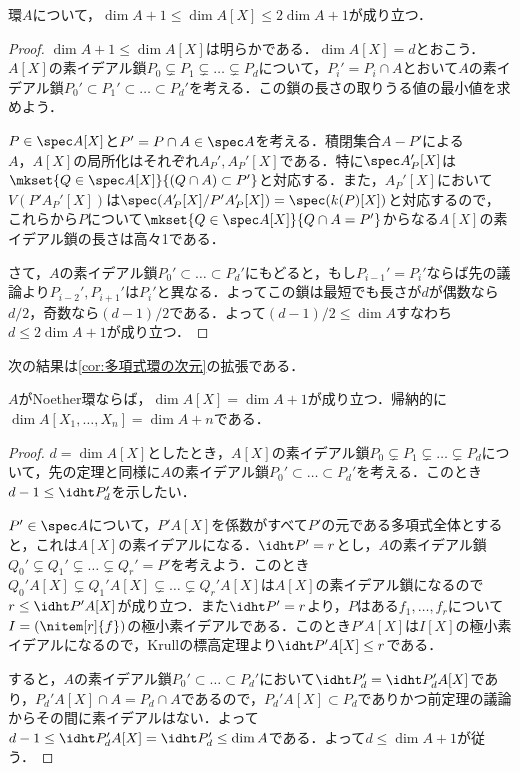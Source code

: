\begin{thm}
	環$A$について，$\dim A+1\leq\dim A[X]\leq 2\dim A+1$が成り立つ．
\end{thm}

\begin{proof}
	$\dim A+1\leq\dim A[X]$は明らかである．$\dim A[X]=d$とおこう．$A[X]$の素イデアル鎖$P_0\subsetneq P_1\subsetneq\dots\subsetneq P_d$について，$P_i'=P_i\cap A$とおいて$A$の素イデアル鎖$P_0'\subset P_1'\subset\dots\subset P_d'$を考える．この鎖の長さの取りうる値の最小値を求めよう．
	
	$P\in\spec A[X]$と$P'=P\cap A\in\spec A$を考える．積閉集合$A-P'$による$A，A[X]$の局所化はそれぞれ$A_P',A_P'[X]$である．特に$\spec A_P'[X]$は$\mkset{Q\in\spec A[X]}{(Q\cap A)\subset P'}$と対応する．また，$A_P'[X]$において$V(P'A_P'[X])$は$\spec (A_P'[X]/P'A_P'[X])=\spec (k(P)[X])$と対応するので，これらから$P$について$\mkset{Q\in\spec A[X]}{Q\cap A=P'}$からなる$A[X]$の素イデアル鎖の長さは高々1である．
	
	さて，$A$の素イデアル鎖$P_0'\subset\dots\subset P_d'$にもどると，もし$P_{i-1}'=P_i'$ならば先の議論より$P_{i-2}',P_{i+1}'$は$P_i'$と異なる．よってこの鎖は最短でも長さが$d$が偶数なら$d/2$，奇数なら$(d-1)/2$である．よって$(d-1)/2\leq \dim A$すなわち$d\leq 2\dim A+1$が成り立つ．
\end{proof}

次の結果は\ref{cor:多項式環の次元}の拡張である．

\begin{cor}\label{cor:Noether多項式の次元}
	$A$がNoether環ならば，$\dim A[X]=\dim A+1$が成り立つ．帰納的に$\dim A[X_1,\dots,X_n]=\dim A+n$である．
\end{cor}

\begin{proof}
	$d=\dim A[X]$としたとき，$A[X]$の素イデアル鎖$P_0\subsetneq P_1\subsetneq\dots\subsetneq P_d$について，先の定理と同様に$A$の素イデアル鎖$P_0'\subset\dots\subset P_d'$を考える．このとき$d-1\leq\idht P_d'$を示したい．
	
	$P'\in\spec A$について，$P'A[X]$を係数がすべて$P'$の元である多項式全体とすると，これは$A[X]$の素イデアルになる．$\idht P'=r$とし，$A$の素イデアル鎖$Q_0'\subsetneq Q_1'\subsetneq\dots\subsetneq Q_r'=P'$を考えよう．このとき$Q_0'A[X]\subsetneq Q_1'A[X]\subsetneq\dots\subsetneq Q_r'A[X]$は$A[X]$の素イデアル鎖になるので$r\leq\idht P'A[X]$が成り立つ．また$\idht P'=r$より，$P$はある$f_1,\dots,f_r$について$I=(\nitem[r]{f})$の極小素イデアルである．このとき$P'A[X]$は$I[X]$の極小素イデアルになるので，Krullの標高定理より$\idht P'A[X]\leq r$である．
	
	すると，$A$の素イデアル鎖$P_0'\subset\dots\subset P_d'$において$\idht P_d'=\idht P_d'A[X]$であり，$P_d'A[X]\cap A=P_d\cap A$であるので，$P_d'A[X]\subset P_d$でありかつ前定理の議論からその間に素イデアルはない．よって$d-1\leq\idht P_d'A[X]=\idht P_d'\leq\dim A$である．よって$d\leq\dim A+1$が従う．
\end{proof}

